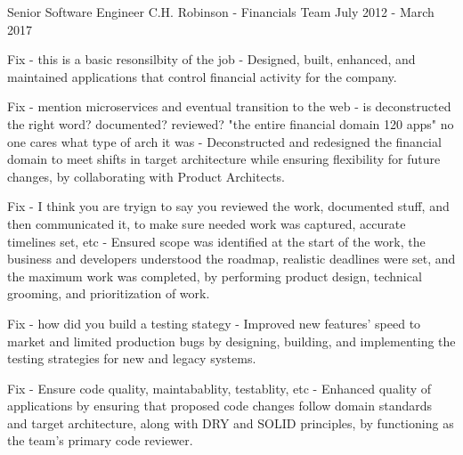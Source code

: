 \begin{cventries}
 \cventry
	{Senior Software Engineer} %
	{C.H. Robinson - Financials Team} %
	{} %
	{July 2012 - March 2017} %
	{
		\begin{cvitems} %
			\item {Fix - this is a basic resonsilbity of the job - Designed, built, enhanced, and maintained applications that control financial activity for the company.}
			\item {Fix - mention microservices and eventual transition to the web - is deconstructed the right word? documented? reviewed? "the entire financial domain 120 apps" no one cares what type of arch it was - Deconstructed and redesigned the financial domain to meet shifts in target architecture while ensuring flexibility for future changes, by collaborating with Product Architects.}
			\item {Fix - I think you are tryign to say you reviewed the work, documented stuff, and then communicated it, to make sure needed work was captured, accurate timelines set, etc - Ensured scope was identified at the start of the work, the business and developers understood the roadmap, realistic deadlines were set, and the maximum work was completed, by performing product design, technical grooming, and prioritization of work.}
			\item {Fix - how did you build a testing stategy - Improved new features' speed to market and limited production bugs by designing, building, and implementing the testing strategies for new and legacy systems.}
			\item {Fix - Ensure code quality, maintabablity, testablity, etc - Enhanced quality of applications by ensuring that proposed code changes follow domain standards and target architecture, along with DRY and SOLID principles, by functioning as the team’s primary code reviewer.}
		\end{cvitems}
	}
	

\end{cventries}
